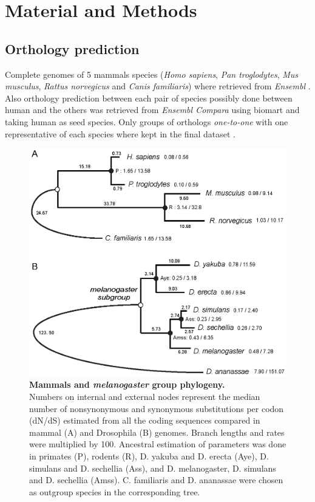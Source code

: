 \section{Material and Methods}
\label{sec:gssa_mat-met}
\subsection{Orthology prediction}

Complete genomes of 5 mammals species (\textit{Homo sapiens}, \textit{Pan troglodytes}, \textit{Mus musculus}, \textit{Rattus norvegicus} and \textit{Canis familiaris}) where retrieved from \textit{Ensembl} \cite{Flicek2011}. Also orthology prediction between each pair of species possibly done between human and the others was retrieved from \textit{Ensembl Compara} \cite{Vilella2009} using biomart \cite{Kinsella2011} and taking human as \gls{seed} species. Only groups of orthologs \textit{one-to-one} with one representative of each species where kept in the final dataset .

\begin{figure}[htpb] 
\centering 
\includegraphics[width=\textwidth]{tex_source/figures/gssa/phylogenies.png}
\caption[Mammals and \textit{Drosophila} phylogeny]{{\bf Mammals and
 \textit{melanogaster} group phylogeny.} \\Numbers on internal and external nodes represent the median number of nonsynonymous and synonymous substitutions per codon (dN/dS) estimated from all the coding sequences compared in mammal (A) and Drosophila (B) genomes. Branch lengths and rates were multiplied by 100. Ancestral estimation of parameters was done in primates (P), rodents (R), D. yakuba and D. erecta (Aye), D. simulans and D. sechellia (Ass), and D. melanogaster, D. simulans and D. sechellia (Amss). C. familiaris and D. ananassae were chosen as outgroup species in the corresponding tree.} 
\label{fig:phylogeny}
\end{figure}


